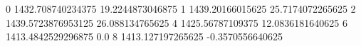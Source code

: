 0 1432.708740234375 19.2244873046875
1 1439.20166015625 25.7174072265625
2 1439.5723876953125 26.088134765625
4 1425.56787109375 12.0836181640625
6 1413.4842529296875 0.0
8 1413.127197265625 -0.3570556640625
